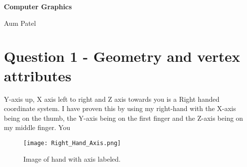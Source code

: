 \documentclass[10pt]{report}
\begin{document}
\begin{titlepage}
\center
{\huge\bfseries Computer Graphics 

Aum Patel
}

\end{titlepage}
\tableofcontents
\chapter{Question 1 - Geometry and vertex attributes}

Y-axis up, X axis left to right and Z axis towards you is a Right handed coordinate system. I have proven this by using my right-hand with the X-axis being on the thumb, the Y-axis being on the first finger and the Z-axis being on my middle finger. You 
\begin{figure}[h]
    \caption{Image of hand with axis labeled.}
    \centering
\texttt{[image: Right\_Hand\_Axis.png]}
\end{figure}
\end{document}
